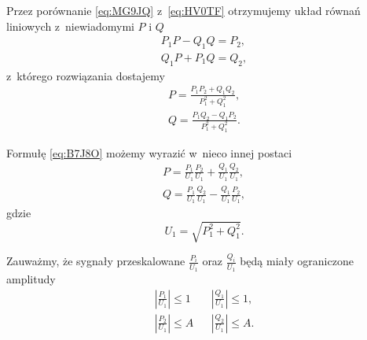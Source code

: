 \documentclass[paper=a4,DIV=12]{tfa}
\begin{document}
Przez porównanie \eqref{eq:MG9JQ} z~\eqref{eq:HV0TF} otrzymujemy układ równań
liniowych z~niewiadomymi $P$ i $Q$
\begin{subequations}
  \begin{align}
    & P_1 P - Q_1 Q = P_2, &
    \label{eq:CKOLT}
    \\
    & Q_1 P + P_1 Q = Q_2, &
    \label{eq:5FLMS}
  \end{align}
  \label{eq:85PRD}
\end{subequations}
z~którego rozwiązania dostajemy
\begin{subequations}
  \begin{align}
    & P = \frac{P_1 P_2 + Q_1 Q_2}{P_1^2 + Q_1^2}, &
    \label{eq:DJRBO}
    \\
    & Q = \frac{P_1 Q_2 - Q_1 P_2}{P_1^2 + Q_1^2}. &
    \label{eq:AR3L3}
  \end{align}
  \label{eq:B7J8O}
\end{subequations}

Formułę \eqref{eq:B7J8O} możemy wyrazić w~nieco innej postaci
\begin{subequations}
  \begin{align}
    & P = \frac{P_1}{U_1} \frac{P_2}{U_1}
          + \frac{Q_1}{U_1} \frac{Q_2}{U_1}, &
    \label{eq:NXSH5}
    \\
    & Q = \frac{P_1}{U_1} \frac{Q_2}{U_1}
          - \frac{Q_1}{U_1} \frac{P_2}{U_1}, &
    \label{eq:6L48H}
  \end{align}
  \label{eq:F3CUU}
\end{subequations}
gdzie
\begin{equation}
  U_1 = \sqrt{P_1^2 + Q_1^2}.
  \label{eq:W79B6}
\end{equation}

Zauważmy, że sygnały przeskalowane $\frac{P_i}{U_1}$ oraz  $\frac{Q_i}{U_1}$
będą miały ograniczone amplitudy
\begin{subequations}
  \begin{align}
    & \left|\frac{P_1}{U_1}\right| \le 1 &
    & \left|\frac{Q_1}{U_1}\right| \le 1, &
    \label{eq:4AA9D}
    \\
    & \left|\frac{P_2}{U_1}\right| \le A &
    & \left|\frac{Q_2}{U_1}\right| \le A. &
    \label{eq:TX2NW}
  \end{align}
\end{subequations}
\end{document}
